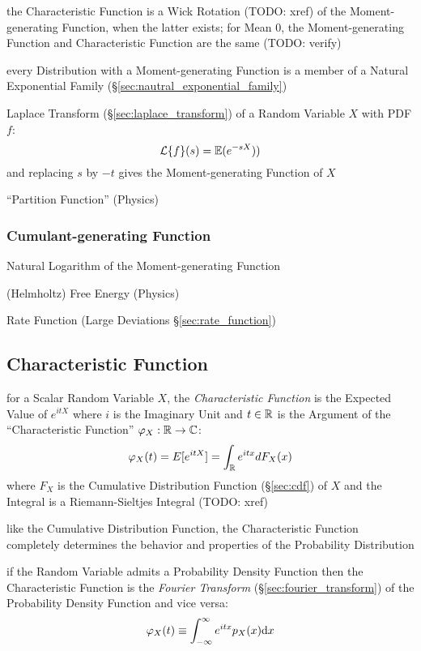 the Characteristic Function is a Wick Rotation (TODO: xref) of the
Moment-generating Function, when the latter exists; for Mean $0$, the
Moment-generating Function and Characteristic Function are the same (TODO:
verify)

every Distribution with a Moment-generating Function is a member of a Natural
Exponential Family (\S\ref{sec:nautral_exponential_family})

Laplace Transform (\S\ref{sec:laplace_transform}) of a Random Variable $X$ with
PDF $f$:
\[
  \mathcal{L}\{f\}(s) = \mathbb{E}(e^{-sX}))
\]
and replacing $s$ by $-t$ gives the Moment-generating Function of $X$

``Partition Function'' (Physics)



\subsubsection{Cumulant-generating Function}
\label{sec:cumulant_generating_function}

Natural Logarithm of the Moment-generating Function

(Helmholtz) Free Energy (Physics)

Rate Function (Large Deviations \S\ref{sec:rate_function})



\subsection{Characteristic Function}\label{sec:characteristic_function}

for a Scalar Random Variable $X$, the \emph{Characteristic Function} is the
Expected Value of $e^{itX}$ where $i$ is the Imaginary Unit and $t \in \mathbb{R}$
is the Argument of the ``Characteristic Function''
$\varphi_X : \mathbb{R} \to \mathbb{C}$:
\[
  \varphi_X(t) = E[e^{itX}] = \int_{\mathbb{R}} e^{itx} dF_X(x)
\]
where $F_X$ is the Cumulative Distribution Function (\S\ref{sec:cdf}) of $X$ and
the Integral is a Riemann-Sieltjes Integral (TODO: xref)

like the Cumulative Distribution Function, the Characteristic Function
completely determines the behavior and properties of the Probability
Distribution

if the Random Variable admits a Probability Density Function then the
Characteristic Function is the \emph{Fourier Transform}
(\S\ref{sec:fourier_transform}) of the Probability Density Function and vice
versa:
\[
  \varphi_X(t) \equiv \int_{-\infty}^\infty e^{itx} p_X(x) \mathrm{d}x
\]

